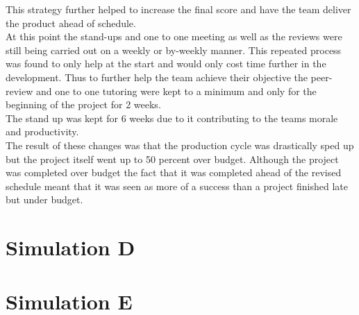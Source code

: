 \documentclass{article}
\begin{document}
This strategy further helped to increase the final score and have the team deliver the product ahead of schedule. \\
At this point the stand-ups and one to one meeting as well as the reviews were still being carried out on a weekly or by-weekly manner. This repeated process was found to only help at the start and would only cost time further in the development. Thus to further help the team achieve their objective the peer-review and one to one tutoring were kept to a minimum and only for the beginning of the project for 2 weeks.\\
The stand up was kept for 6 weeks due to it contributing to the teams morale and productivity.\\
The result of these changes was that the production cycle was drastically sped up but the project itself went up to 50 percent over budget. Although the project was completed over budget the fact that it was completed ahead of the revised schedule meant that it was seen as more of a success than a project finished late but under budget.





\pagebreak


\section{Simulation D}

\section{Simulation E}










	
\end{document}
